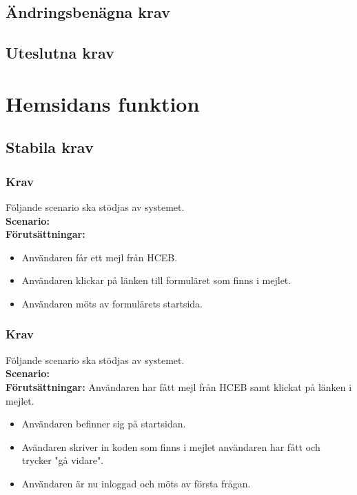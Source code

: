 \documentclass{article}
\begin{document}
    \subsection{Ändringsbenägna krav}
    \subsection{Uteslutna krav}
    
    \section{Hemsidans funktion}
    
    \subsection{Stabila krav}
       \subsubsection{Krav}
    Följande scenario ska stödjas av systemet.
        \\
       \indent \textbf{Scenario:}
        \\
       \indent \textbf{Förutsättningar:}
            \begin{itemize}
                \item  Användaren får ett mejl från HCEB.
                \item Användaren klickar på länken till formuläret som finns i mejlet.
                \item Användaren möts av formulärets startsida.
            \end{itemize}
            
        \subsubsection{Krav}
    Följande scenario ska stödjas av systemet.
        \\
       \indent \textbf{Scenario:}
        \\
       \indent \textbf{Förutsättningar:}
       Användaren har fått mejl från HCEB samt klickat på länken i mejlet.
            \begin{itemize}
                \item   Användaren befinner sig på startsidan.
                \item Avändaren skriver in koden som finns i mejlet användaren har fått och trycker "gå vidare".
                \item  Användaren är nu inloggad och möts av första frågan.
            \end{itemize}
\end{document}
